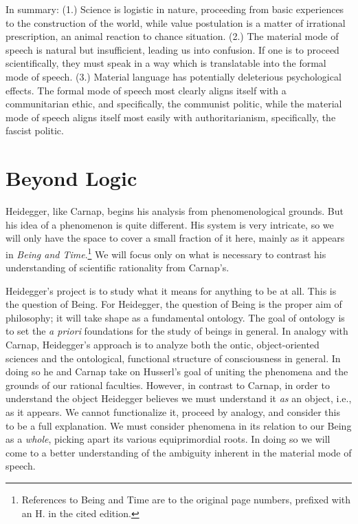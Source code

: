 \documentclass[leqno, 12pt]{turabian-researchpaper}
\begin{document}
	In summary: (1.) Science is logistic in nature, proceeding from basic
	experiences to the construction of the world, while value postulation is a matter
	of irrational prescription, an animal reaction to chance situation. (2.) The material
	mode of speech is natural but insufficient, leading us into confusion. If one is
	to proceed scientifically, they must speak in a way which is translatable into
	the formal mode of speech. (3.) Material language has potentially deleterious psychological
	effects. The formal mode of speech most clearly aligns itself with a
	communitarian ethic, and specifically, the communist politic, while the material
	mode of speech aligns itself most easily with authoritarianism, specifically, the
	fascist politic.

	\section{Beyond Logic}

	Heidegger, like Carnap, begins his analysis from phenomenological grounds. But
	his idea of a phenomenon is quite different. His system is very intricate, so we
	will only have the space to cover a small fraction of it here, mainly as it
	appears in \textit{Being and Time}.\footnote{References to Being and Time are
	to the original page numbers, prefixed with an H. in the cited edition.} We will
	focus only on what is necessary to contrast his understanding of scientific rationality
	from Carnap's.

	Heidegger's project is to study what it means for anything to be at all. This
	is the question of Being. For Heidegger, the question of Being is the proper
	aim of philosophy; it will take shape as a fundamental ontology. The goal of
	ontology is to set the \textit{a priori} foundations for the study of beings in
	general. In analogy with Carnap, Heidegger's approach is to analyze both the ontic,
	object-oriented sciences and the ontological, functional structure of consciousness
	in general. In doing so he and Carnap take on Husserl's goal of uniting the
	phenomena and the grounds of our rational faculties. However, in contrast to
	Carnap, in order to understand the object Heidegger believes we must understand
	it \emph{as} an object, i.e., as it appears. We cannot functionalize it, proceed
	by analogy, and consider this to be a full explanation. We must consider phenomena
	in its relation to our Being as a \emph{whole}, picking apart its various equiprimordial
	roots. In doing so we will come to a better understanding of the ambiguity
	inherent in the material mode of speech.
\end{document}
